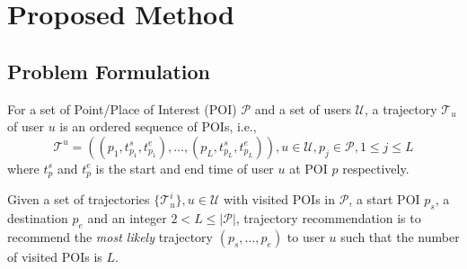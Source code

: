 \section{Proposed Method}
\label{method}


\subsection{Problem Formulation}
\label{method:formulation}
For a set of Point/Place of Interest (POI) $\mathcal{P}$ and a set of users $\mathcal{U}$,
a trajectory $\mathcal{T}_u$ of user $u$ is an ordered sequence of POIs,
i.e.,
\begin{displaymath}
    \mathcal{T}^u = ((p_1, t_{p_1}^s, t_{p_{1}}^e), \dots, (p_L, t_{p_L}^s, t_{p_L}^e)), 
    u \in \mathcal{U}, 
    p_j \in \mathcal{P}, 1 \le j \le L
\end{displaymath}
where $t_p^s$ and $t_p^e$ is the start and end time of user $u$ at POI $p$ respectively.

Given a set of trajectories $\{ \mathcal{T}_u^i \}, u \in \mathcal{U}$ with visited POIs in $\mathcal{P}$, 
a start POI $p_s$, a destination $p_e$ and an integer $2 < L \le |\mathcal{P}|$,
trajectory recommendation is to recommend the \textit{most likely} trajectory $(p_s, \dots, p_e)$ to user $u$ such that
the number of visited POIs is $L$.


